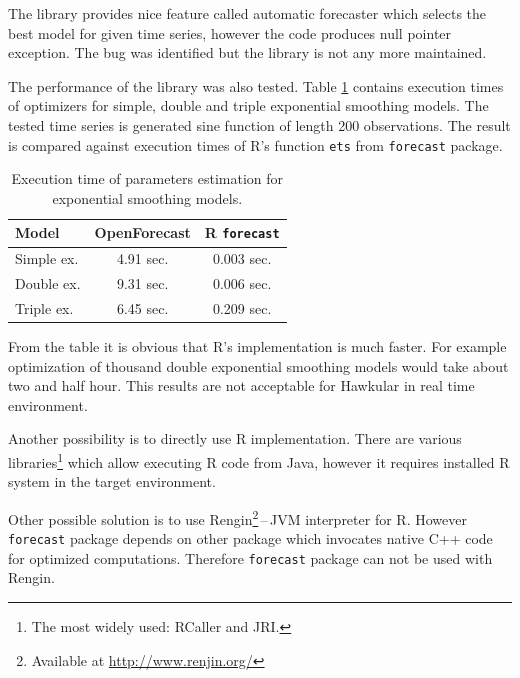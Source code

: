     The library provides nice feature called automatic forecaster which selects the best model for given
    time series, however the code produces null pointer exception. The bug was identified but the library is not any
    more maintained.

    The performance of the library was also tested. Table \ref{tab:open-forecast-perf} contains execution times of
    optimizers for simple, double and triple exponential smoothing models. The tested time series is generated sine
    function of length 200 observations. The result is compared against execution times of R's function \texttt{ets}
    from \texttt{forecast} package.

    \begin{table}[h]
        \begin{center}
            \begin{tabular}{l|c|c}
                \textbf{Model} & \textbf{OpenForecast} & \textbf{R \texttt{forecast}} \\ \hline \hline
                Simple ex. & 4.91 sec. & 0.003 sec.\\
                Double ex. & 9.31 sec. & 0.006 sec.\\
                Triple ex. & 6.45 sec. & 0.209 sec.\\
            \end{tabular}
            \caption{Execution time of parameters estimation for exponential smoothing models.}
            \label{tab:open-forecast-perf}
        \end{center}
    \end{table}

    From the table it is obvious that R's implementation is much faster. For example optimization of thousand double
    exponential smoothing models would take about two and half hour. This results are not acceptable for Hawkular in
    real time environment.

    Another possibility is to directly use R implementation. There are various libraries\footnote{The most widely used:
    RCaller and JRI.} which allow executing R code from Java, however it requires installed R system in the target
    environment.

    Other possible solution is to use Rengin\footnote{Available at \url{http://www.renjin.org/}}\,--\,JVM interpreter
    for R. However \texttt{forecast} package depends on other package which invocates native C++ code for optimized
    computations. Therefore \texttt{forecast} package can not be used with Rengin.

